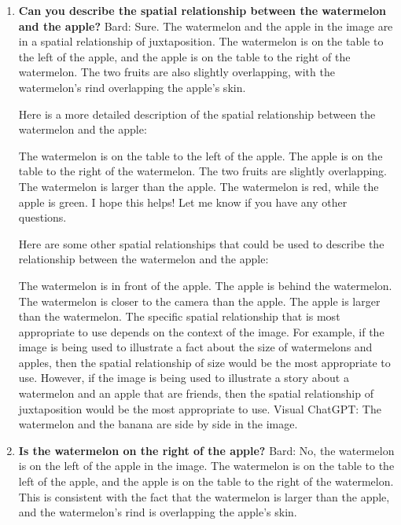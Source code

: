     \begin{enumerate}
        \item \textbf{Can you describe the spatial relationship between the watermelon and the apple?}
        \subitem Bard:
        Sure. The watermelon and the apple in the image are in a spatial relationship of juxtaposition. The watermelon is on the table to the left of the apple, and the apple is on the table to the right of the watermelon. The two fruits are also slightly overlapping, with the watermelon's rind overlapping the apple's skin.

        Here is a more detailed description of the spatial relationship between the watermelon and the apple:

        The watermelon is on the table to the left of the apple.
        The apple is on the table to the right of the watermelon.
        The two fruits are slightly overlapping.
        The watermelon is larger than the apple.
        The watermelon is red, while the apple is green.
        I hope this helps! Let me know if you have any other questions.

        Here are some other spatial relationships that could be used to describe the relationship between the watermelon and the apple:

        The watermelon is in front of the apple.
        The apple is behind the watermelon.
        The watermelon is closer to the camera than the apple.
        The apple is larger than the watermelon.
        The specific spatial relationship that is most appropriate to use depends on the context of the image. For example, if the image is being used to illustrate a fact about the size of watermelons and apples, then the spatial relationship of size would be the most appropriate to use. However, if the image is being used to illustrate a story about a watermelon and an apple that are friends, then the spatial relationship of juxtaposition would be the most appropriate to use.
        \subitem Visual ChatGPT: The watermelon and the banana are side by side in the image.
        \item \textbf{Is the watermelon on the right of the apple?}
        \subitem Bard: 
        No, the watermelon is on the left of the apple in the image. The watermelon is on the table to the left of the apple, and the apple is on the table to the right of the watermelon. This is consistent with the fact that the watermelon is larger than the apple, and the watermelon's rind is overlapping the apple's skin.
        

\end{enumerate}
